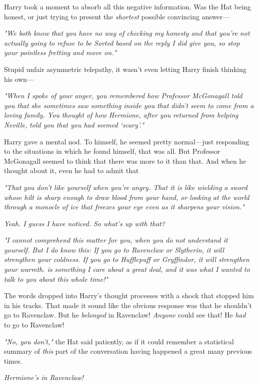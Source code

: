 Harry took a moment to absorb all this negative information. Was the Hat being
honest, or just trying to present the \emph{shortest} possible convincing
answer\mbox{---}

\emph{"We both know that you have no way of checking my honesty and that you're
not actually going to refuse to be Sorted based on the reply I did give you, so
stop your pointless fretting and move on."}

Stupid unfair asymmetric telepathy, it wasn't even letting Harry finish
thinking his own\mbox{---}

\emph{"When I spoke of your anger, you remembered how Professor McGonagall told
you that she sometimes saw something inside you that didn't seem to come from a
loving family. You thought of how Hermione, after you returned from helping
Neville, told you that you had seemed `scary'."}

Harry gave a mental nod. To himself, he seemed pretty normal---just responding
to the situations in which he found himself, that was all. But Professor
McGonagall seemed to think that there was more to it than that. And when he
thought about it, even he had to admit that{\el}

\emph{"That you don't like yourself when you're angry. That it is like wielding
a sword whose hilt is sharp enough to draw blood from your hand, or looking at
the world through a monocle of ice that freezes your eye even as it sharpens
your vision."}

\emph{Yeah. I guess I have noticed. So what's up with that?}

\emph{"I cannot comprehend this matter for you, when you do not understand it
yourself. But I do know this: If you go to Ravenclaw or Slytherin, it will
strengthen your coldness. If you go to Hufflepuff or Gryffindor, it will
strengthen your warmth.  is something I care about a great deal, and it was
what I wanted to talk to you about this whole time!"}

The words dropped into Harry's thought processes with a shock that stopped him
in his tracks. That made it sound like the obvious response was that he
shouldn't go to Ravenclaw. But he \emph{belonged} in Ravenclaw! \emph{Anyone}
could see that! He \emph{had} to go to Ravenclaw!

\emph{"No, you don't,"} the Hat said patiently, as if it could remember a
statistical summary of \emph{this} part of the conversation having happened a
great many previous times.

\emph{Hermione's in Ravenclaw!}

